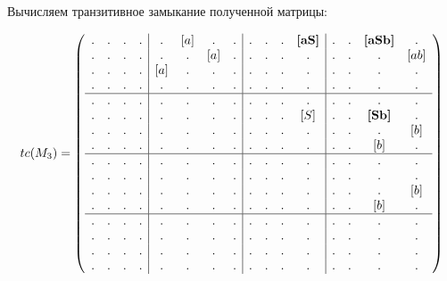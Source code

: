 \begin{example}
Вычисляем транзитивное замыкание полученной матрицы:

\begin{align}
tc(M_3) =
\left(\begin{array}{c c c c | c c c c | c c c c | c c c c } 
. & . & . & .  &  . & [a] & . & .  &  . & . & . & \textbf{[aS]}  &  . & . & \textbf{[aSb]} & .   \\
. & . & . & .  &  . & . & [a] & .  &  . & . & . & .              &  . & . & .              & [ab]   \\
. & . & . & .  &  [a] & . & . & .  &  . & . & . & .              &  . & . & .              & .   \\
. & . & . & .  &  . & . & . & .    &  . & . & . & .              &  . & . & .              & .   \\
\hline
. & . & . & .  &  . & . & . & .    &  . & . & . & .              &  . & . & . & .    \\
. & . & . & .  &  . & . & . & .    &  . & . & . & [S]            &  . & . & \textbf{[Sb]}    & .    \\
. & . & . & .  &  . & . & . & .    &  . & . & . & .              &  . & . & .    & [b]  \\
. & . & . & .  &  . & . & . & .    &  . & . & . & .              &  . & . & [b]  & .    \\
\hline                                                              
. & . & . & .  &  . & . & . & .    &  . & . & . & .              &  . & . & . & .   \\
. & . & . & .  &  . & . & . & .    &  . & . & . & .              &  . & . & . & .   \\
. & . & . & .  &  . & . & . & .    &  . & . & . & .              &  . & . & . & [b] \\
. & . & . & .  &  . & . & . & .    &  . & . & . & .              &  . & . & [b] & . \\
\hline                                                              
. & . & . & .  &  . & . & . & .    &  . & . & . & .              &  . & . & . & .   \\
. & . & . & .  &  . & . & . & .    &  . & . & . & .              &  . & . & . & .   \\
. & . & . & .  &  . & . & . & .    &  . & . & . & .              &  . & . & . & .   \\
. & . & . & .  &  . & . & . & .    &  . & . & . & .              &  . & . & . & . 
\end{array}\right)
\label{eq:graph_tm}
\end{align}


\end{example}
